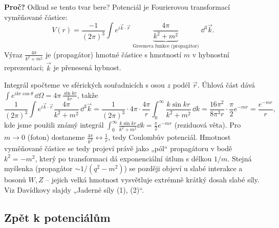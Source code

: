 \textbf{Proč?} Odkud se tento tvar bere? Potenciál je Fourierovou transformací  vyměňované částice:
\[
  V(r) = \frac{-1}{(2\pi)^3}\int e^{i\vec{k}\cdot\vec{r}}\;
  \underbrace{\frac{4\pi}{k^2+m^2}}_{\text{Greenova funkce (propagátor)}}\; \dd^3\vec{k} .
\]
Výraz \(\frac{4\pi}{k^2+m^2}\) je  (propagátor) hmotné částice s hmotností \(m\) v hybnostní
reprezentaci; \(\vec{k}\) je přenesená hybnost.

\begin{vysvetleni}
Integrál spočteme ve sférických souřadnicích s osou \(z\) podél \(\vec{r}\). Úhlová část dává
\(\int e^{ikr\cos\theta}\,\dd\Omega = 4\pi\,\frac{\sin kr}{kr}\), takže
\[
  \frac{1}{(2\pi)^3}\int e^{i\vec{k}\cdot\vec{r}}\frac{4\pi}{k^2+m^2}\,\dd^3\vec{k}
  = \frac{1}{(2\pi)^3}\cdot 4\pi\cdot\frac{4\pi}{r}\int_0^\infty \frac{k\sin kr}{k^2+m^2}\,\dd k
  = \frac{16\pi^2}{8\pi^3 r}\cdot\frac{\pi}{2}e^{-mr} = \frac{e^{-mr}}{r},
\]
kde jsme použili známý integrál \(\int_0^\infty \frac{k\sin kr}{k^2+m^2}\dd k = \frac{\pi}{2}e^{-mr}\) (reziduová věta).
Pro \(m\to0\) (foton) dostaneme \(\frac{4\pi}{k^2} \leftrightarrow \frac{1}{r}\), tedy Coulombův potenciál. Hmotnost
vyměňované částice se tedy projeví právě jako „pól“ propagátoru v bodě \(k^2=-m^2\), který po transformaci dá
exponenciální útlum s délkou \(1/m\). Stejná myšlenka (propagátor \(\sim 1/(q^2 - m^2)\)) se později objeví u slabé
interakce a bosonů \(W, Z\) -- jejich velká hmotnost vysvětluje extrémně krátký dosah slabé síly.
Viz Davídkovy slajdy „Jaderné síly (1), (2)“.
\end{vysvetleni}

\subsection{Zpět k potenciálům}

